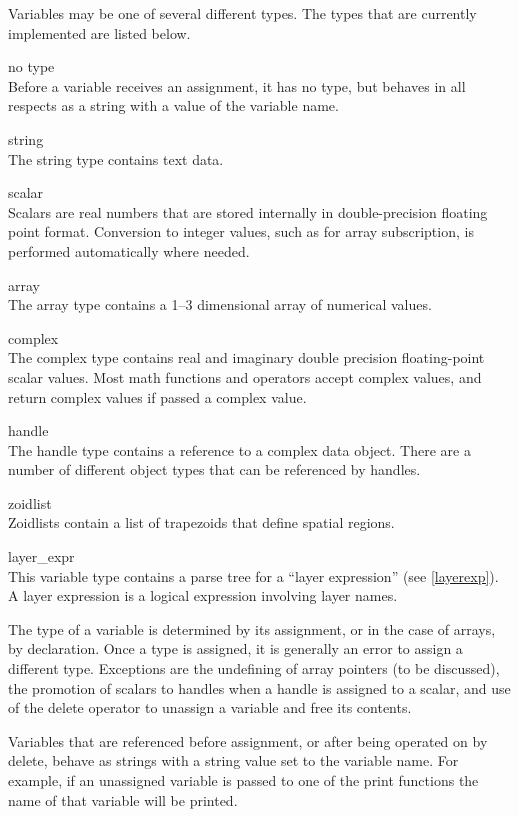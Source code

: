 Variables may be one of several different types.  The types that
are currently implemented are listed below.
\begin{description}
\item{no type}\\
Before a variable receives an assignment, it has no type, but behaves
in all respects as a string with a value of the variable name.
\item{string}\\
The string type contains text data.
\item{scalar}\\
Scalars are real numbers that are stored internally in
double-precision floating point format.  Conversion to integer values,
such as for array subscription, is performed automatically where
needed.
\item{array}\\
The array type contains a 1--3 dimensional array of numerical values.
\item{complex}\\
The complex type contains real and imaginary double precision
floating-point scalar values.  Most math functions and operators
accept complex values, and return complex values if passed a complex
value.
\item{handle}\\
The handle type contains a reference to a complex data object.  There
are a number of different object types that can be referenced by
handles.
\item{zoidlist}\\
Zoidlists contain a list of trapezoids that define spatial regions.
\item{layer\_expr}\\
This variable type contains a parse tree for a ``layer expression''
(see \ref{layerexp}).  A layer expression is a logical expression
involving layer names.
\end{description}

The type of a variable is determined by its assignment, or in the case
of arrays, by declaration.  Once a type is assigned, it is generally
an error to assign a different type.  Exceptions are the undefining of
array pointers (to be discussed), the promotion of scalars to handles
when a handle is assigned to a scalar, and use of the {\vt delete}
operator to unassign a variable and free its contents.

Variables that are referenced before assignment, or after being
operated on by {\vt delete}, behave as strings with a string value
set to the variable name.  For example, if an unassigned variable is
passed to one of the print functions the name of that variable will be
printed.

